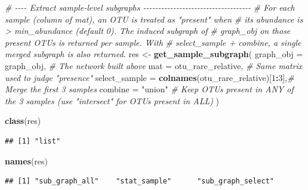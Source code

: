 \documentclass[
]{book}
\newenvironment{Shaded}{\begin{snugshade}}{\end{snugshade}}
\newcommand{\AttributeTok}[1]{\textcolor[rgb]{0.13,0.29,0.53}{#1}}
\newcommand{\CommentTok}[1]{\textcolor[rgb]{0.56,0.35,0.01}{\textit{#1}}}
\newcommand{\DecValTok}[1]{\textcolor[rgb]{0.00,0.00,0.81}{#1}}
\newcommand{\FunctionTok}[1]{\textcolor[rgb]{0.13,0.29,0.53}{\textbf{#1}}}
\newcommand{\NormalTok}[1]{#1}
\newcommand{\OtherTok}[1]{\textcolor[rgb]{0.56,0.35,0.01}{#1}}
\newcommand{\SpecialCharTok}[1]{\textcolor[rgb]{0.81,0.36,0.00}{\textbf{#1}}}
\newcommand{\StringTok}[1]{\textcolor[rgb]{0.31,0.60,0.02}{#1}}
\begin{document}
\begin{Shaded}
\begin{Highlighting}[]
\CommentTok{\# {-}{-}{-}{-} Extract sample{-}level subgraphs {-}{-}{-}{-}{-}{-}{-}{-}{-}{-}{-}{-}{-}{-}{-}{-}{-}{-}{-}{-}{-}{-}{-}{-}{-}{-}{-}{-}{-}{-}{-}{-}{-}{-}{-}{-}}
\CommentTok{\# For each sample (column of \textasciigrave{}mat\textasciigrave{}), an OTU is treated as "present" when}
\CommentTok{\# its abundance is \textgreater{} \textasciigrave{}min\_abundance\textasciigrave{} (default 0). The induced subgraph of}
\CommentTok{\# \textasciigrave{}graph\_obj\textasciigrave{} on those present OTUs is returned per sample. With}
\CommentTok{\# \textasciigrave{}select\_sample\textasciigrave{} + \textasciigrave{}combine\textasciigrave{}, a single merged subgraph is also returned.}
\NormalTok{res }\OtherTok{\textless{}{-}} \FunctionTok{get\_sample\_subgraph}\NormalTok{(}
  \AttributeTok{graph\_obj     =}\NormalTok{ graph\_obj,                       }\CommentTok{\# The network built above}
  \AttributeTok{mat           =}\NormalTok{ otu\_rare\_relative,               }\CommentTok{\# Same matrix used to judge "presence"}
  \AttributeTok{select\_sample =} \FunctionTok{colnames}\NormalTok{(otu\_rare\_relative)[}\DecValTok{1}\SpecialCharTok{:}\DecValTok{3}\NormalTok{],}\CommentTok{\# Merge the first 3 samples}
  \AttributeTok{combine       =} \StringTok{"union"}                          \CommentTok{\# Keep OTUs present in ANY of the 3 samples (use "intersect" for OTUs present in ALL)}
\NormalTok{)}

\FunctionTok{class}\NormalTok{(res)}
\end{Highlighting}
\end{Shaded}

\begin{verbatim}
## [1] "list"
\end{verbatim}

\begin{Shaded}
\begin{Highlighting}[]
\FunctionTok{names}\NormalTok{(res)}
\end{Highlighting}
\end{Shaded}

\begin{verbatim}
## [1] "sub_graph_all"    "stat_sample"      "sub_graph_select"
\end{verbatim}

\begin{Shaded}
\end{Shaded}
\end{document}
